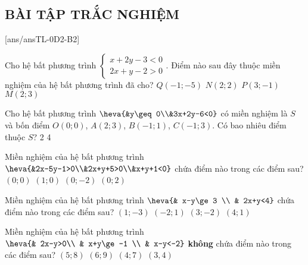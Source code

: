 \subsection{BÀI TẬP TRẮC NGHIỆM}
[ans/ansTL-0D2-B2]
\setcounter{ex}{0}
\begin{ex}%
	Cho hệ bất phương trình $\begin{cases}
		x+2y-3<0\\
		2x+y-2>0
	\end{cases}$. Điểm nào sau đây thuộc miền nghiệm của hệ bất phương trình đã cho?
	\choice
	{$Q(-1;-5)$}
	{$N(2;2) $}
	{\True$P(3;-1) $}
	{$M(2;3)$}
\end{ex}

\begin{ex}%
	Cho hệ bất phương trình $\heva{&y\geq0\\&3x+2y-6<0}$ có miền nghiệm là $S$ và bốn điểm $O(0;0)$, $A(2;3)$, $B(-1;1)$, $C(-1;3)$. Có bao nhiêu điểm thuộc $S$?
	{2}
	{}
	{4}
\end{ex}

\begin{ex}%
	Miền nghiệm của hệ bất phương trình $\heva{&2x-5y-1>0\\&2x+y+5>0\\&x+y+1<0}$ chứa điểm nào trong các điểm sau?
	\choice
	{$(0;0)$}
	{$(1;0)$}
	{\True $(0;-2)$}
	{$(0;2)$}
\end{ex}

\begin{ex}%
	Miền nghiệm của hệ bất phương trình $\heva{& x-y\ge 3 \\ & 2x+y<4}$ chứa điểm nào trong các điểm sau?
	\choice
	{\True $(1;-3)$}
	{$(-2;1)$}
	{$(3;-2)$}
	{$(4;1)$}
\end{ex}

\begin{ex}%
	Miền nghiệm của hệ bất phương trình $\heva{& 2x-y>0\\ & x+y\ge -1 \\ & x-y<-2}$ \textbf{không} chứa điểm nào trong các điểm sau?
	\choice
	{$(5;8)$}
	{$(6;9)$}
	{$(4;7)$}
	{\True $(3,4)$}
\end{ex}

